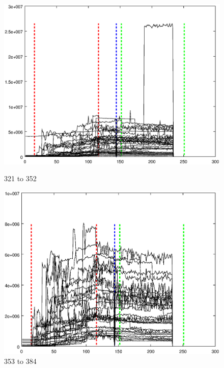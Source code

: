 \documentclass{article}
\begin{document}
\begin{figure}[h]
\centering
\begin{minipage}{.49\textwidth}
	\centering
	\includegraphics[width=0.79\linewidth]{measurement/spad_321-352}
	\caption{321 to 352}
	\label{fig:spad_321-352}
\end{minipage}
\begin{minipage}{.49\textwidth}
	\centering
	\includegraphics[width=0.79\linewidth]{measurement/spad_353-384}
	\caption{353 to 384}
	\label{fig:spad_353-384}
\end{minipage}
\end{figure}
\end{document}
